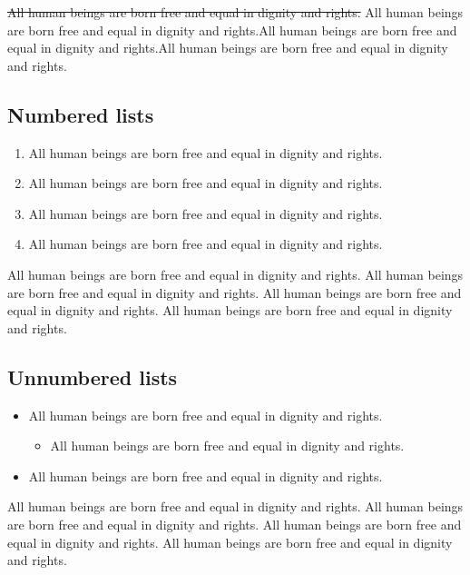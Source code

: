 \documentclass[
  ngerman,
  american,
  ]{scrartcl}
\providecommand{\tightlist}{%
  \setlength{\itemsep}{0pt}\setlength{\parskip}{0pt}}
\begin{document}
\st{All human beings are born free and equal in dignity and rights.} All
human beings are born free and equal in dignity and rights.All human
beings are born free and equal in dignity and rights.All human beings
are born free and equal in dignity and rights.

\subsection{Numbered lists}\label{numbered-lists}

\begin{enumerate}
\def\labelenumi{\arabic{enumi}.}
\tightlist
\item
  All human beings are born free and equal in dignity and rights.
\item
  All human beings are born free and equal in dignity and rights.
\item
  All human beings are born free and equal in dignity and rights.
\item
  All human beings are born free and equal in dignity and rights.
\end{enumerate}

All human beings are born free and equal in dignity and rights. All
human beings are born free and equal in dignity and rights. All human
beings are born free and equal in dignity and rights. All human beings
are born free and equal in dignity and rights.

\subsection{Unnumbered lists}\label{unnumbered-lists}

\begin{itemize}
\tightlist
\item
  All human beings are born free and equal in dignity and rights.

  \begin{itemize}
  \tightlist
  \item
    All human beings are born free and equal in dignity and rights.
  \end{itemize}
\item
  All human beings are born free and equal in dignity and rights.
\end{itemize}

All human beings are born free and equal in dignity and rights. All
human beings are born free and equal in dignity and rights. All human
beings are born free and equal in dignity and rights. All human beings
are born free and equal in dignity and rights.
\end{document}
